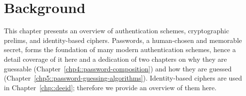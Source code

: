 \chapter{Background}
\label{chp::background}

This chapter presents an overview of authentication schemes, cryptographic prelims, and identity-based ciphers. Passwords, a human-chosen and memorable secret, forms the foundation of many modern authentication schemes, hence a detail coverage of it here and a dedication of two chapters on why they are guessable (Chapter~\ref{chp4::password-composition}) and how they are guessed (Chapter~\ref{chp5::password-guessing-algorithms}). Identity-based ciphers are used in Chapter~\ref{chp::deeid}; therefore we provide an overview of them here.




%